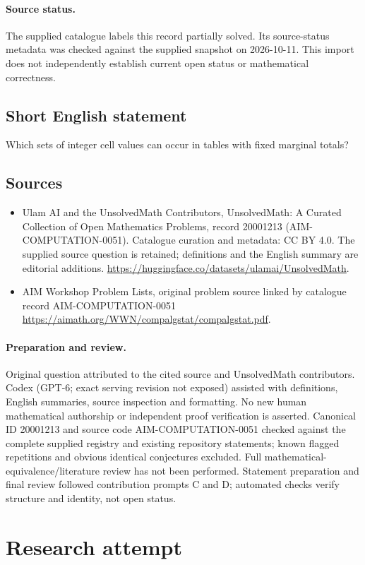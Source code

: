 \documentclass[11pt]{article}
\begin{document}
\paragraph{Source status.}
The supplied catalogue labels this record partially solved. Its source-status metadata was checked against the supplied snapshot on 2026-10-11. This import does not independently establish current open status or mathematical correctness.
\subsection{Short English statement}
Which sets of integer cell values can occur in tables with fixed marginal totals?
\subsection{Sources}
\begin{itemize}
\item[S1] Ulam AI and the UnsolvedMath Contributors, UnsolvedMath: A Curated Collection of Open Mathematics Problems, record 20001213 (AIM-COMPUTATION-0051). Catalogue curation and metadata: CC BY 4.0. The supplied source question is retained; definitions and the English summary are editorial additions.
\url{https://huggingface.co/datasets/ulamai/UnsolvedMath}.
\item[S2] AIM Workshop Problem Lists, original problem source linked by catalogue record AIM-COMPUTATION-0051
\url{https://aimath.org/WWN/compalgstat/compalgstat.pdf}.
\end{itemize}
\paragraph{Preparation and review.}
Original question attributed to the cited source and UnsolvedMath contributors. Codex (GPT-6; exact serving revision not exposed) assisted with definitions, English summaries, source inspection and formatting. No new human mathematical authorship or independent proof verification is asserted. Canonical ID 20001213 and source code AIM-COMPUTATION-0051 checked against the complete supplied registry and existing repository statements; known flagged repetitions and obvious identical conjectures excluded. Full mathematical-equivalence/literature review has not been performed. Statement preparation and final review followed contribution prompts C and D; automated checks verify structure and identity, not open status.
\label{end:20001213}


\section{Research attempt}
\end{document}
